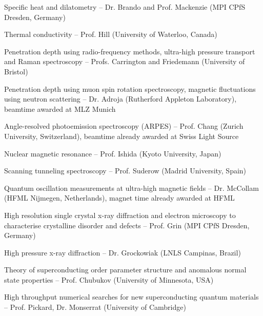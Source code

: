 \begin{leftlist}
\item
  Specific heat and dilatometry -- Dr. Brando and Prof. Mackenzie (MPI CPfS Dresden, Germany)
\item
  Thermal conductivity -- Prof. Hill (University of Waterloo,
  Canada)
\item
  Penetration depth using radio-frequency methods, ultra-high pressure transport and Raman spectroscopy -- Profs. Carrington and Friedemann (University of Bristol)
\item
  Penetration depth using muon spin rotation spectroscopy, magnetic fluctuations using neutron scattering -- Dr.
  Adroja (Rutherford Appleton Laboratory), beamtime awarded at MLZ Munich
\item
 Angle-resolved photoemission spectroscopy (ARPES) -- %
 Prof. Chang (Zurich University, Switzerland), beamtime already awarded at Swiss Light Source
\item
  Nuclear magnetic resonance -- Prof. Ishida (Kyoto University,
  Japan)
\item
  Scanning tunneling spectroscopy -- %
  Prof. Suderow (Madrid University, Spain)
 \item
  Quantum oscillation measurements at ultra-high magnetic fields -- Dr. McCollam (HFML Nijmegen, Netherlands), magnet time already awarded at HFML
  \item
High resolution single crystal x-ray diffraction and electron microscopy to characterise crystalline disorder and defects -- Prof. Grin (MPI CPfS Dresden, Germany)
\item 
High pressure x-ray diffraction -- Dr. Grockowiak (LNLS Campinas, Brazil)

\item
 Theory of superconducting order parameter structure and anomalous normal state properties -- Prof. Chubukov (University of Minnesota, USA)
\item
 High throughput numerical searches for new superconducting quantum materials -- Prof. Pickard, Dr. Monserrat (University of Cambridge) 

\end{leftlist}

